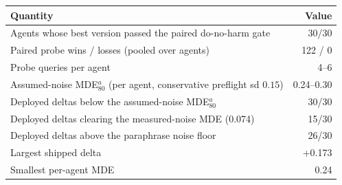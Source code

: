 \begin{tabular}{lr}
\toprule
Quantity & Value \\
\midrule
Agents whose best version passed the paired do-no-harm gate & 30/30 \\
Paired probe wins / losses (pooled over agents) & 122 / 0 \\
Probe queries per agent & 4--6 \\
Assumed-noise MDE$^{a}_{80}$ (per agent, conservative preflight sd $0.15$) & 0.24--0.30 \\
Deployed deltas below the assumed-noise MDE$^{a}_{80}$ & 30/30 \\
Deployed deltas clearing the measured-noise MDE (0.074) & 15/30 \\
Deployed deltas above the paraphrase noise floor & 26/30 \\
Largest shipped delta & +0.173 \\
Smallest per-agent MDE & 0.24 \\
\bottomrule
\end{tabular}
